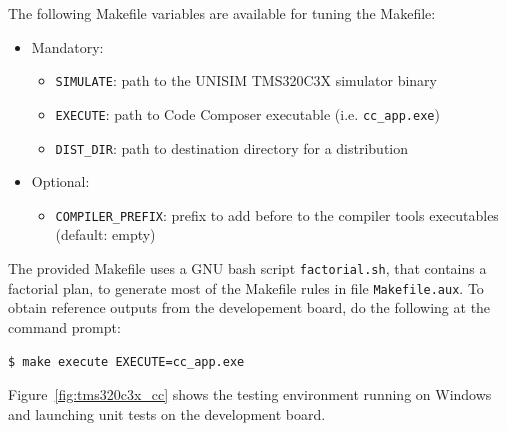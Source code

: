 \noindent The following Makefile variables are available for tuning the Makefile:
\begin{itemize}
\item Mandatory:
	\begin{itemize}
	\item \texttt{SIMULATE}: path to the UNISIM TMS320C3X simulator binary
	\item \texttt{EXECUTE}: path to Code Composer executable (i.e. \texttt{cc\_app.exe})
	\item \texttt{DIST\_DIR}: path to destination directory for a distribution
	\end{itemize}
\item Optional:
	\begin{itemize}
	\item \texttt{COMPILER\_PREFIX}: prefix to add before to the compiler tools executables (default: empty)
	\end{itemize}
\end{itemize}

The provided Makefile uses a GNU bash script \texttt{factorial.sh}, that contains a factorial plan, to generate most of the Makefile rules in file \texttt{Makefile.aux}.
To obtain reference outputs from the developement board, do the following at the command prompt:
\begin{verbatim}
$ make execute EXECUTE=cc_app.exe
\end{verbatim}

Figure~\ref{fig:tms320c3x_cc} shows the testing environment running on Windows and launching unit tests on the development board.

